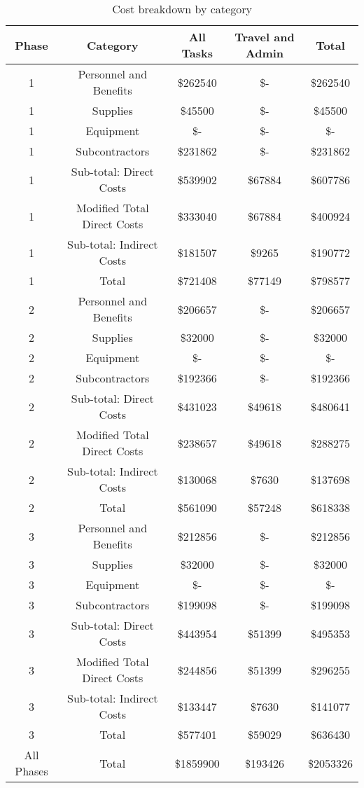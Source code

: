 \begin{table}[H]
  \centering
  \begin{tabular}{|c||c||c|c|c|}
    \hline
    Phase & Category & All Tasks & Travel and Admin & Total\\
    \hline
    \hline
    1 & Personnel and Benefits & \$262540 & \$- & \$262540 \\
    \hline
    1 & Supplies & \$45500 & \$- & \$45500 \\
    \hline
    1 & Equipment & \$- & \$- & \$- \\
    \hline
    1 & Subcontractors & \$231862 & \$- & \$231862 \\
    \hline
    1 & Sub-total: Direct Costs & \$539902 & \$67884 & \$607786 \\
    \hline
    1 & Modified Total Direct Costs & \$333040 & \$67884 & \$400924 \\
    \hline
    1 & Sub-total: Indirect Costs & \$181507 & \$9265 & \$190772 \\
    \hline
    1 & Total & \$721408 & \$77149 & \$798577 \\
    \hline
    \hline
    2 & Personnel and Benefits & \$206657 & \$- & \$206657 \\
    \hline
    2 & Supplies & \$32000 & \$- & \$32000 \\
    \hline
    2 & Equipment & \$- & \$- & \$- \\
    \hline
    2 & Subcontractors & \$192366 & \$- & \$192366 \\
    \hline
    2 & Sub-total: Direct Costs & \$431023 & \$49618 & \$480641 \\
    \hline
    2 & Modified Total Direct Costs & \$238657 & \$49618 & \$288275 \\
    \hline
    2 & Sub-total: Indirect Costs & \$130068 & \$7630 & \$137698 \\
    \hline
    2 & Total & \$561090 & \$57248 & \$618338 \\
    \hline
    \hline
    3 & Personnel and Benefits & \$212856 & \$- & \$212856 \\
    \hline
    3 & Supplies & \$32000 & \$- & \$32000 \\
    \hline
    3 & Equipment & \$- & \$- & \$- \\
    \hline
    3 & Subcontractors & \$199098 & \$- & \$199098 \\
    \hline
    3 & Sub-total: Direct Costs & \$443954 & \$51399 & \$495353 \\
    \hline
    3 & Modified Total Direct Costs & \$244856 & \$51399 & \$296255 \\
    \hline
    3 & Sub-total: Indirect Costs & \$133447 & \$7630 & \$141077 \\
    \hline
    3 & Total & \$577401 & \$59029 & \$636430 \\
    \hline
    \hline
    All Phases & Total & \$1859900 & \$193426 & \$2053326 \\
    \hline
    \hline

  \end{tabular}
  \caption{Cost breakdown by category}
  \label{tab:catcost}
\end{table}

